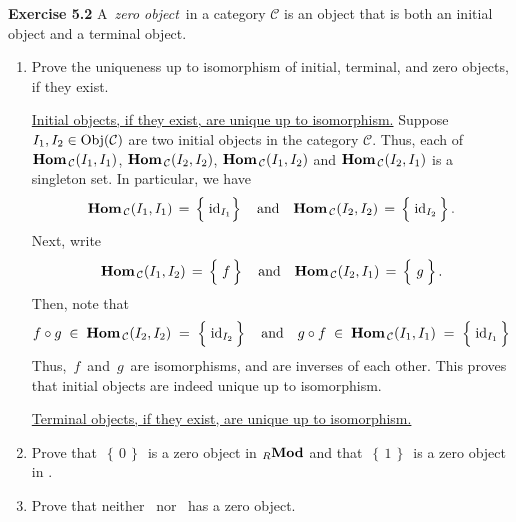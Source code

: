 \vskip 0.5cm
\noindent
\textbf{Exercise 5.2}
\vskip 0.2cm
\noindent
A \,\textit{zero object}\, in a category $\mathcal{C}$ is an object that is both an initial object
and a terminal object.
\begin{enumerate}
\item
	Prove the uniqueness up to isomorphism of initial, terminal, and zero objects, if they exist.
	
	\proof
	\vskip 0.2cm
	\underline{Initial objects, if they exist, are unique up to isomorphism.}
	\vskip 0.0cm
	Suppose $I_{1}, I_{2} \in \textnormal{Obj}(\mathcal{C})$ are two initial objects in the category $\mathcal{C}$.
	Thus, each of $\textbf{Hom}_{\,\mathcal{C}}(I_{1},I_{1})$, $\textbf{Hom}_{\,\mathcal{C}}(I_{2},I_{2})$,
	$\textbf{Hom}_{\,\mathcal{C}}(I_{1},I_{2})$ and $\textbf{Hom}_{\,\mathcal{C}}(I_{2},I_{1})$ is a singleton set.
	In particular, we have
	\begin{equation*}
	\Hom_{\,\mathcal{C}}(I_{1},I_{1}) \,=\, \left\{\;\overset{{\color{white}.}}{\id}_{I_{1}}\right\}
	\quad\textnormal{and}\quad
	\Hom_{\,\mathcal{C}}(I_{2},I_{2}) \,=\, \left\{\;\overset{{\color{white}.}}{\id}_{I_{2}}\,\right\}.
	\end{equation*}
	Next, write
	\begin{equation*}
	\Hom_{\,\mathcal{C}}(I_{1},I_{2}) \,=\, \left\{\;\overset{{\color{white}.}}{f}\,\right\}
	\quad\textnormal{and}\quad
	\Hom_{\,\mathcal{C}}(I_{2},I_{1}) \,=\, \left\{\;\overset{{\color{white}-}}{g}\,\right\}.
	\end{equation*}
	Then, note that
	\begin{equation*}
	f \circ g \;\in\; \Hom_{\,\mathcal{C}}(I_{2},I_{2}) \;=\; \left\{\;\overset{{\color{white}.}}{\id}_{I_{2}}\,\right\}
	\quad\textnormal{and}\quad
	g \circ f \;\in\; \Hom_{\,\mathcal{C}}(I_{1},I_{1}) \;=\; \left\{\;\overset{{\color{white}.}}{\id}_{I_{1}}\,\right\}
	\end{equation*}
	Thus, \,$f$\, and \,$g$\, are isomorphisms, and are inverses of each other.
	This proves that initial objects are indeed unique up to isomorphism.

	\vskip 0.2cm
	\underline{Terminal objects, if they exist, are unique up to isomorphism.}
	\vskip 0.0cm

\item
	Prove that \,$\left\{\,0\,\right\}$\, is a zero object in $_{R}\textbf{Mod}$ and that
	\,$\left\{\,1\,\right\}$\, is a zero object in \Groups.
	
\item
	Prove that neither \Sets\, nor \Top\, has a zero object.
	
\end{enumerate}


\renewcommand{\theenumi}{\roman{enumi}}
\renewcommand{\labelenumi}{\textnormal{(\theenumi)}$\;\;$}

